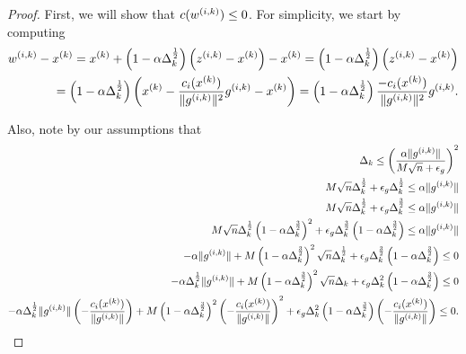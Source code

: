 \begin{proof}
First, we will show that $c({w^{(i, k)}}) \le 0$.
For simplicity, we start by computing
\begin{align*}
{w^{(i, k)}} - {x^{(k)}} = {x^{(k)}} + \left(1 - \alpha \Delta_k^{\frac 1 2 }\right)\left({z^{(i, k)}} - {x^{(k)}}\right) - {x^{(k)}} 
= \left(1 - \alpha \Delta_k^{\frac 1 2 }\right)\left({z^{(i, k)}} - {x^{(k)}}\right) \\
= \left(1 - \alpha \Delta_k^{\frac 1 2 }\right)\left({x^{(k)}} - \frac{c_i({x^{(k)}})}{\|{g^{(i, k)}}\|^2}{g^{(i, k)}} - {x^{(k)}}\right) 
= \left(1 - \alpha \Delta_k^{\frac 1 2 }\right)\frac{-c_i({x^{(k)}})}{\|{g^{(i, k)}}\|^2}{g^{(i, k)}}.
\end{align*}

Also, note by our assumptions that
\begin{align*}
\Delta_k \le \left(\frac{\alpha \|{g^{(i, k)}}\|}{M \sqrt{n} + \epsilon_g}\right)^2 \\
M \sqrt{n}\Delta_k^{\frac 1 2} + \epsilon_g \Delta_k^{\frac 1 2} \le \alpha \|{g^{(i, k)}}\| \\
M \sqrt{n}\Delta_k^{\frac 1 2} + \epsilon_g \Delta_k^{\frac 3 2} \le \alpha \|{g^{(i, k)}}\| \\
M \sqrt{n}\Delta_k^{\frac 1 2}\left(1 - \alpha \Delta_k^{\frac 3 2 }\right)^2  + \epsilon_g \Delta_k^{\frac 3 2} \left(1 - \alpha \Delta_k^{\frac 3 2 }\right) \le \alpha \|{g^{(i, k)}}\| \\
-\alpha \|{g^{(i, k)}}\| + M \left(1 - \alpha \Delta_k^{\frac 3 2 }\right)^2 \sqrt{n}\Delta_k^{\frac 1 2 }+ \epsilon_g \Delta_k^{\frac 3 2} \left(1 - \alpha \Delta_k^{\frac 3 2 }\right) \le 0 \\
-\alpha \Delta_k^{\frac 1 2 }\|{g^{(i, k)}}\| + M \left(1 - \alpha \Delta_k^{\frac 3 2 }\right)^2 \sqrt{n}\Delta_k+ \epsilon_g \Delta_k^2 \left(1 - \alpha \Delta_k^{\frac 3 2 }\right) \le 0 \\
-\alpha \Delta_k^{\frac 1 2 }\|{g^{(i, k)}}\|\left(-\frac{c_i({x^{(k)}})}{\|{g^{(i, k)}}\|}\right) + M \left(1 - \alpha \Delta_k^{\frac 3 2 }\right)^2 \left(-\frac{c_i({x^{(k)}})}{\|{g^{(i, k)}}\|}\right)^2+ \epsilon_g \Delta_k^2 \left(1 - \alpha \Delta_k^{\frac 3 2 }\right)\left(-\frac{c_i({x^{(k)}})}{\|{g^{(i, k)}}\|}\right) \le 0.
\end{align*}



\end{proof}
